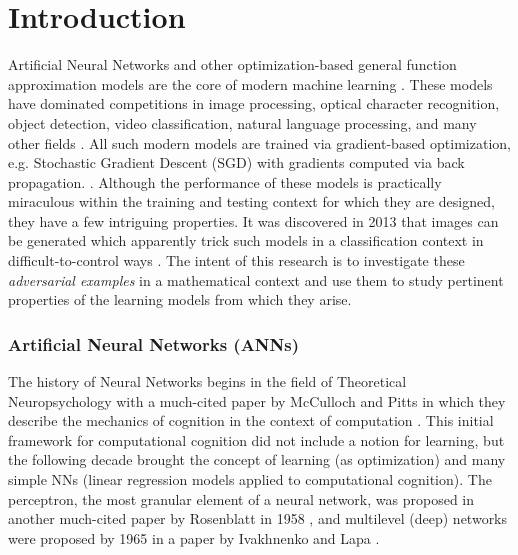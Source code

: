 
\chapter{Introduction} %

\label{Chapter1} %





Artificial Neural Networks and other optimization-based general
function approximation models are the core of modern
machine learning \cite{prakash2018}. These models have dominated competitions in image processing, optical character recognition, object detection, video classification, natural language processing, and many other fields \cite{SCHMIDHUBER201585}. All such modern models are
trained via gradient-based optimization, e.g. Stochastic Gradient Descent (SGD) with
gradients computed via back propagation. \cite{goodfellow2013multidigit}. Although the performance of these models is practically
miraculous within the training and testing context for which they are designed, they have a few intriguing properties. It was discovered in 2013 
\cite{Szegedy2013} that images can be generated
which apparently trick such models in a classification context in  difficult-to-control ways \cite{Khoury2018}. The intent of this
research is to investigate these \emph{adversarial examples} in a
mathematical context and use them to study pertinent 
properties of the learning models from which they arise.

\subsection{Artificial Neural Networks (ANNs)}


The history of Neural Networks begins in the field of Theoretical Neuropsychology with a much-cited paper by McCulloch and Pitts in which they describe the mechanics of cognition in the context of computation \cite{mcculloch1943logical}. This initial framework for computational cognition did not include a notion for learning, but the following decade brought the concept of learning (as optimization) and many simple NNs (linear regression models applied to computational cognition). The perceptron, the most granular element of a neural network, was proposed in another much-cited paper by Rosenblatt in 1958 \cite{rosenblatt1958perceptron}, and multilevel (deep) networks were proposed by 1965 in a paper by Ivakhnenko and Lapa \cite{ivakhnenko1965cybernetic}. 

